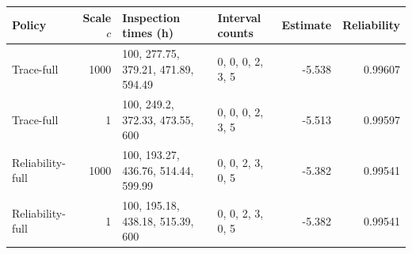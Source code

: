 \begin{tabular}{lrllrr}
\toprule
Policy & Scale $c$ & Inspection times (h) & Interval counts & Estimate & Reliability \\
\midrule
Trace-full & 1000 & 100, 277.75, 379.21, 471.89, 594.49 & 0, 0, 0, 2, 3, 5 & -5.538 & 0.99607 \\
Trace-full & 1 & 100, 249.2, 372.33, 473.55, 600 & 0, 0, 0, 2, 3, 5 & -5.513 & 0.99597 \\
Reliability-full & 1000 & 100, 193.27, 436.76, 514.44, 599.99 & 0, 0, 2, 3, 0, 5 & -5.382 & 0.99541 \\
Reliability-full & 1 & 100, 195.18, 438.18, 515.39, 600 & 0, 0, 2, 3, 0, 5 & -5.382 & 0.99541 \\
\bottomrule
\end{tabular}
